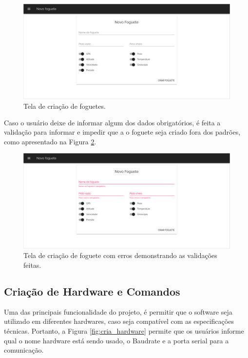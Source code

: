 \begin{figure}[h!]
	\centering
		\includegraphics[keepaspectratio=true,scale=0.33]{figuras/telas_software/1.png}
	\caption{Tela de criação de foguetes.}
	\label{fig:cria_foguete}
\end{figure}

Caso o usuário deixe de informar algum dos dados obrigatórios, é feita a validação para informar e impedir que a o foguete seja criado fora dos padrões, como apresentado na Figura \ref{fig:cria_foguete_error}.

\begin{figure}[h!]
	\centering
		\includegraphics[keepaspectratio=true,scale=0.33]{figuras/telas_software/1-error.png}
	\caption{Tela de criação de foguete com erros demonstrando as validações feitas.}
	\label{fig:cria_foguete_error}
\end{figure}

\subsection{Criação de Hardware e Comandos}

Uma das principais funcionalidade do projeto, é permitir que o software seja utilizado em diferentes hardwares, caso seja compatível com as especificações técnicas. Portanto, a Figura \ref{fig:cria_hardware} permite que os usuários informe qual o nome hardware está sendo usado, o Baudrate e a porta serial para a comunicação.

